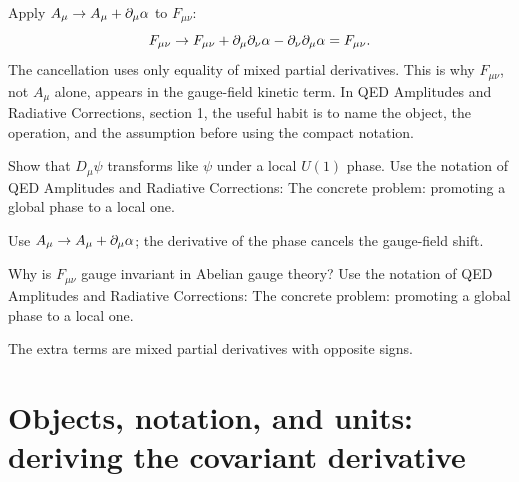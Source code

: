 \begin{example}
Apply \(A_\mu\to A_\mu+\partial_\mu\alpha\) to \(F_{\mu\nu}\):
\[
  F_{\mu\nu}\to F_{\mu\nu}+\partial_\mu\partial_\nu\alpha-\partial_\nu\partial_\mu\alpha=F_{\mu\nu}.
\]
The cancellation uses only equality of mixed partial derivatives.  This is why \(F_{\mu\nu}\), not \(A_\mu\) alone, appears in the gauge-field kinetic term.  In QED Amplitudes and Radiative Corrections, section 1, the useful habit is to name the object, the operation, and the assumption before using the compact notation.
\end{example}



\begin{exercise}
Show that \(D_\mu\psi\) transforms like \(\psi\) under a local \(U(1)\) phase.  Use the notation of QED Amplitudes and Radiative Corrections: The concrete problem: promoting a global phase to a local one.
\begin{answer}
Use \(A_\mu\to A_\mu+\partial_\mu\alpha\); the derivative of the phase cancels the gauge-field shift.
\end{answer}
\end{exercise}

\begin{exercise}
Why is \(F_{\mu\nu}\) gauge invariant in Abelian gauge theory?  Use the notation of QED Amplitudes and Radiative Corrections: The concrete problem: promoting a global phase to a local one.
\begin{answer}
The extra terms are mixed partial derivatives with opposite signs.
\end{answer}
\end{exercise}



\section{Objects, notation, and units: deriving the covariant derivative}













